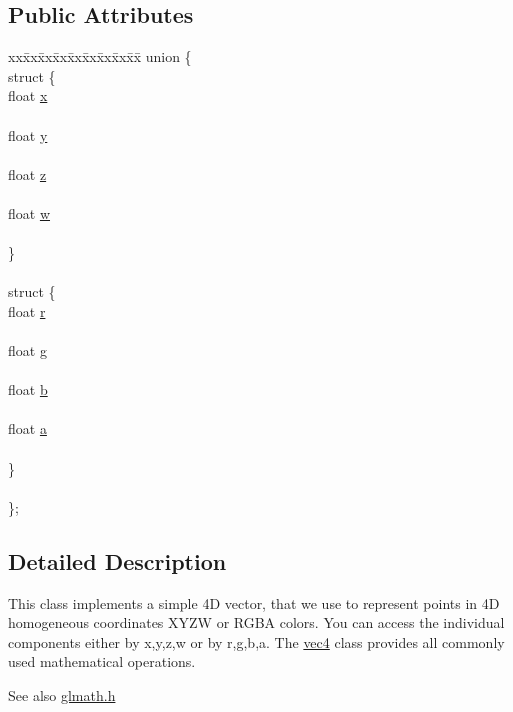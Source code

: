 \subsection*{Public Attributes}
\begin{DoxyCompactItemize}
\item 
\begin{tabbing}
xx\=xx\=xx\=xx\=xx\=xx\=xx\=xx\=xx\=\kill
union \{\\
\>struct \{\\
\>\>float \hyperlink{classvec4_a36c650782a67137380c83b01545c94d6}{x}\\
\>\>\\
\>\>float \hyperlink{classvec4_a7328fe0e502fce92fa32016193052e92}{y}\\
\>\>\\
\>\>float \hyperlink{classvec4_a12b318751110db034dddc450cdec455d}{z}\\
\>\>\\
\>\>float \hyperlink{classvec4_a0c92fe67e490d9768217a00c2e8abd49}{w}\\
\>\>\\
\>\} \\
\>\>\\
\>struct \{\\
\>\>float \hyperlink{classvec4_a1682827e4304b44e6f768d616cdf3899}{r}\\
\>\>\\
\>\>float \hyperlink{classvec4_aa626a2728056a1b410fb8e133bdffd05}{g}\\
\>\>\\
\>\>float \hyperlink{classvec4_a62421478df6548c8e5e24d33345e3417}{b}\\
\>\>\\
\>\>float \hyperlink{classvec4_ac1c847c2cd65c10fd059fceb8e57a5f6}{a}\\
\>\>\\
\>\} \\
\>\>\\
\}; \\

\end{tabbing}\end{DoxyCompactItemize}


\subsection{Detailed Description}
This class implements a simple 4D vector, that we use to represent points in 4D homogeneous coordinates X\+Y\+ZW or R\+G\+BA colors. You can access the individual components either by x,y,z,w or by r,g,b,a. The \hyperlink{classvec4}{vec4} class provides all commonly used mathematical operations. \begin{DoxySeeAlso}{See also}
\hyperlink{glmath_8h}{glmath.\+h} 
\end{DoxySeeAlso}


